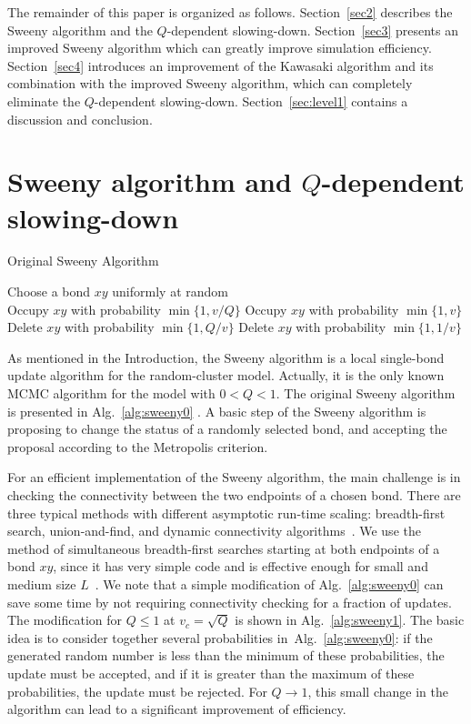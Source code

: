 \documentclass[aps,pre,twocolumn,superscriptaddress,longbibliography,floatfix]{revtex4-2}
\begin{document}
{The remainder of this paper is organized as follows. Section~\ref{sec2} describes the Sweeny algorithm and the $Q$-dependent slowing-down. Section~\ref{sec3} presents an improved Sweeny algorithm which can greatly improve simulation efficiency. Section~\ref{sec4} introduces an improvement of the Kawasaki algorithm and its combination with the improved Sweeny algorithm, which can completely eliminate  the $Q$-dependent slowing-down. Section~\ref{sec:level1} contains a discussion and conclusion.}

\section{\label{sec2}Sweeny algorithm and $Q$-dependent slowing-down}

\begin{algorithm}[b]
\caption{Original Sweeny Algorithm}
\label{alg:sweeny0}
Choose a bond $xy$ uniformly at random\\
{Occupy $xy$ with probability $\min \{1,v/Q\}$}
{Occupy $xy$ with probability $\min\{1,v\}$}
{Delete $xy$ with probability $\min\{1,Q/v\}$}
{Delete $xy$ with probability $\min\{1,1/v\}$}
\end{algorithm}

As mentioned in the Introduction, the Sweeny algorithm is a local single-bond update algorithm for the random-cluster model. Actually, it is the only known MCMC algorithm for the model with $0 <Q < 1$. 
The original Sweeny algorithm~\cite{sweeny1983monte} is presented in Alg.~\ref{alg:sweeny0} . A basic step of the Sweeny algorithm is proposing to change the status of a randomly selected bond, and accepting the proposal according to the Metropolis criterion.  

For an efficient implementation of the Sweeny algorithm, the main challenge is in checking the connectivity between the two endpoints of a chosen bond. There are three typical methods with different asymptotic run-time scaling: breadth-first search, union-and-find, and dynamic connectivity algorithms~\cite{elcci2013efficient,elci2015algorithmic}. We use the method of simultaneous breadth-first searches starting at both endpoints of a bond $xy$, since it has very simple code and is effective enough for small and medium size $L$~\cite{deng2010some}. We note that a simple modification of Alg.~\ref{alg:sweeny0} can save some time by not requiring connectivity checking for a fraction of updates. The modification for $Q\le 1$ at $v_c=\sqrt{Q}$ is shown in Alg.~\ref{alg:sweeny1}.
The basic idea is to consider together several probabilities in~Alg.~\ref{alg:sweeny0}: if the generated random number is less than the minimum of these probabilities, the update must be accepted, and if it is greater than the maximum of these probabilities, the update must be rejected. For $Q \to 1$, this small change in the algorithm can lead to a significant improvement of efficiency.
\end{document}
